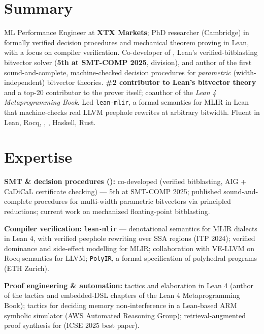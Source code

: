 \documentclass[9pt,a4paper]{extarticle}
\begin{document}
\cvheader

\section{Summary}
ML Performance Engineer at \textbf{XTX Markets}; PhD researcher (Cambridge) in formally verified decision procedures and mechanical theorem
proving in Lean, with a focus on compiler verification.
Co-developer of \bvdecide{}, Lean's verified-bitblasting bitvector solver
(\textbf{5th at SMT-COMP 2025}, \qfbv{} division), and author of the first sound-and-complete,
machine-checked decision procedures for \emph{parametric} (width-independent) bitvector
theories.
\textbf{\#2 contributor to Lean's bitvector theory} and a top-20 contributor to the prover
itself; coauthor of the \emph{Lean 4 Metaprogramming Book}.
Led \texttt{lean-mlir}, a formal semantics for MLIR in Lean that machine-checks real LLVM
peephole rewrites at arbitrary bitwidth.
Fluent in Lean, Rocq, \fstar{}, \cpp{}, Haskell, Rust.

\section{Expertise}
\begin{records}
\item \textbf{SMT \& decision procedures (\qfbv{}):} co-developed \bvdecide{} (verified
bitblasting, AIG + CaDiCaL certificate checking) --- 5th at SMT-COMP 2025; published
sound-and-complete procedures for multi-width parametric bitvectors via principled reductions;
current work on mechanized floating-point bitblasting.
\item \textbf{Compiler verification:} \texttt{lean-mlir} --- denotational semantics for MLIR
dialects in Lean 4, with verified peephole rewriting over SSA regions (ITP 2024); verified
dominance and side-effect modelling for MLIR; collaboration with VE-LLVM on Rocq semantics for
LLVM; \texttt{PolyIR}, a formal specification of polyhedral programs (ETH Zurich).
\item \textbf{Proof engineering \& automation:} tactics and elaboration in Lean 4 (author of the
tactics and embedded-DSL chapters of the Lean 4 Metaprogramming Book); tactics for deciding
memory non-interference in a Lean-based ARM symbolic simulator (AWS Automated Reasoning Group);
retrieval-augmented proof synthesis for \fstar{} (ICSE 2025 best paper).
\end{records}
\end{document}
